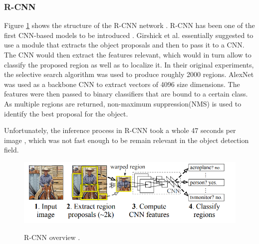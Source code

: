 \subsubsection{R-CNN}

Figure \ref{rcnn} shows the structure of the R-CNN network \cite{Girshick2013}. R-CNN has been one of the first CNN-based models to be introduced \cite{Zaidi2021}. Girshick et al. essentially suggested to use a module that extracts the object proposals and then to pass it to a CNN. The CNN would then extract the features relevant, which would in turn allow to classify the proposed region as well as to localize it. In their original experiments, the selective search algorithm  \cite{Uijlings13} was used to produce roughly 2000 regions. AlexNet  \cite{NIPS2012_c399862d} was used as a backbone CNN to extract vectors of 4096 size dimensions. The features were then passed to binary classifiers that are bound to a certain class. As multiple regions are returned, non-maximum suppression(NMS) \cite{Hosang2017}  is used to identify the best proposal for the object. 

Unfortunately, the inference process in R-CNN took a whole 47 seconds per image \cite{Girshick2013}, which was not fast enough to be remain relevant in the object detection field. 

\begin{figure}[htb]
	\begin{center}
		\includegraphics[width=12cm]{./rcnn.png}
	\end{center}
	\caption{R-CNN overview \cite{Girshick2013}.}
	\begin{center}
		\label{rcnn}
	\end{center}
\end{figure}



